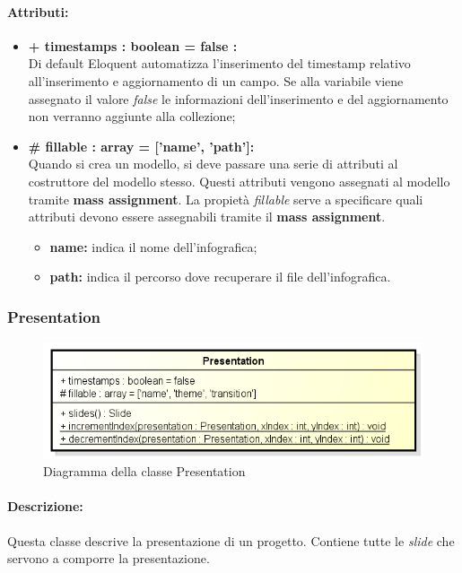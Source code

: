 	\paragraph{Attributi:}
		\begin{itemize}
			\item \textbf{+ timestamps : boolean = false :}\\
			Di default Eloquent automatizza l'inserimento del timestamp relativo all'inserimento e aggiornamento di un campo. Se alla variabile viene assegnato il valore \textit{false} le informazioni dell'inserimento e del aggiornamento non verranno aggiunte alla collezione;
			\item \textbf{\# fillable : array = [’name’, ’path’]:}\\
			Quando si crea un modello, si deve passare una serie di attributi al costruttore del modello stesso. Questi attributi vengono assegnati al modello tramite \textbf{mass assignment}. La propietà \textit{fillable} serve a specificare quali attributi devono essere assegnabili tramite il \textbf{mass assignment}.
			\begin{itemize}
				\item \textbf{name:} indica il nome dell'\gls{infografica};
				\item \textbf{path:} indica il percorso dove recuperare il file dell'\gls{infografica}.
			\end{itemize}
		\end{itemize}
\newpage


\subsubsection{Presentation}

	\begin{figure}[h]
		\centering
		\includegraphics[width=0.8\linewidth]{img/back_end_premi_model_presentation}
		\caption[Diagramma della classe Presentation]{Diagramma della classe Presentation}
		\label{fig:back_end_premi_model_presentation}
	\end{figure}


	\paragraph{Descrizione:}
	Questa classe descrive la presentazione di un progetto. Contiene tutte le \textit{\gls{slide}} che servono a comporre la presentazione.

